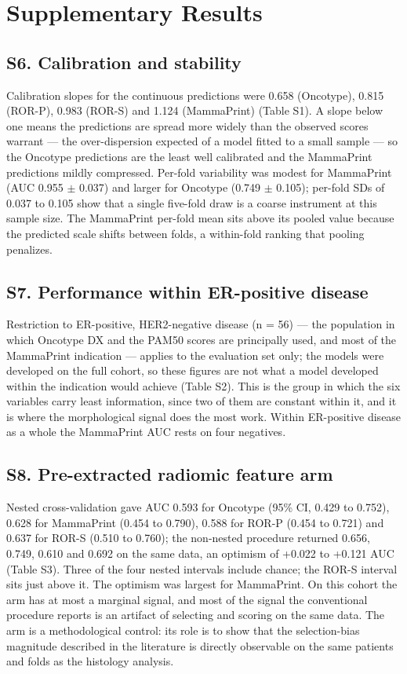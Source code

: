 \documentclass[11pt,a4paper]{article}
\begin{document}
\section{Supplementary Results}
\subsection{S6. Calibration and stability}
Calibration slopes for the continuous predictions were 0.658 (Oncotype), 0.815 (ROR-P), 0.983 (ROR-S) and 1.124 (MammaPrint) (Table S1). A slope below one means the predictions are spread more widely than the observed scores warrant --- the over-dispersion expected of a model fitted to a small sample --- so the Oncotype predictions are the least well calibrated and the MammaPrint predictions mildly compressed. Per-fold variability was modest for MammaPrint (AUC 0.955 $\pm$ 0.037) and larger for Oncotype (0.749 $\pm$ 0.105); per-fold SDs of 0.037 to 0.105 show that a single five-fold draw is a coarse instrument at this sample size. The MammaPrint per-fold mean sits above its pooled value because the predicted scale shifts between folds, a within-fold ranking that pooling penalizes.

\subsection{S7. Performance within ER-positive disease}
Restriction to ER-positive, HER2-negative disease (n = 56) --- the population in which Oncotype DX and the PAM50 scores are principally used, and most of the MammaPrint indication --- applies to the evaluation set only; the models were developed on the full cohort, so these figures are not what a model developed within the indication would achieve (Table S2). This is the group in which the six variables carry least information, since two of them are constant within it, and it is where the morphological signal does the most work. Within ER-positive disease as a whole the MammaPrint AUC rests on four negatives.

\subsection{S8. Pre-extracted radiomic feature arm}
Nested cross-validation gave AUC 0.593 for Oncotype (95\% CI, 0.429 to 0.752), 0.628 for MammaPrint (0.454 to 0.790), 0.588 for ROR-P (0.454 to 0.721) and 0.637 for ROR-S (0.510 to 0.760); the non-nested procedure returned 0.656, 0.749, 0.610 and 0.692 on the same data, an optimism of +0.022 to +0.121 AUC (Table S3). Three of the four nested intervals include chance; the ROR-S interval sits just above it. The optimism was largest for MammaPrint. On this cohort the arm has at most a marginal signal, and most of the signal the conventional procedure reports is an artifact of selecting and scoring on the same data. The arm is a methodological control: its role is to show that the selection-bias magnitude described in the literature is directly observable on the same patients and folds as the histology analysis.
\end{document}
